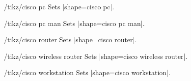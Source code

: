 \documentclass[a4paper]{ltxdoc}
\begin{document}
\begin{stylekey}{/tikz/cisco pc}
Sets |shape={cisco pc}|.
\begin{codeexample}[preamble={\usetikzlibrary{shapes.cisco.pc}}]
\tikz{\node[cisco pc] {};}
\end{codeexample}
\end{stylekey}

\begin{stylekey}{/tikz/cisco pc man}
Sets |shape={cisco pc man}|.
\begin{codeexample}[preamble={\usetikzlibrary{shapes.cisco.pcman}}]
\end{codeexample}
\end{stylekey}

\begin{stylekey}{/tikz/cisco router}
Sets |shape={cisco router}|.
\begin{codeexample}[preamble={\usetikzlibrary{shapes.cisco.router}}]
\end{codeexample}
\end{stylekey}

\begin{stylekey}{/tikz/cisco wireless router}
Sets |shape={cisco wireless router}|.
\begin{codeexample}[preamble={\usetikzlibrary{shapes.cisco.wirelessrouter}}]
\end{codeexample}
\end{stylekey}

\begin{stylekey}{/tikz/cisco workstation}
Sets |shape={cisco workstation}|.
\begin{codeexample}[preamble={\usetikzlibrary{shapes.cisco.workstation}}]
\end{codeexample}
\end{stylekey}
\end{document}
